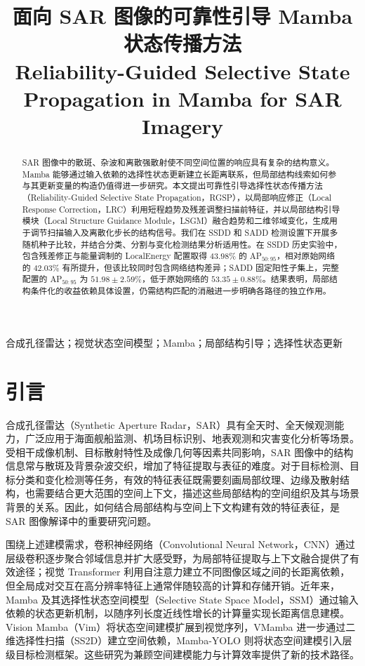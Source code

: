 \documentclass[journal]{IEEEtran}
\title{\LARGE 面向 SAR 图像的可靠性引导 Mamba 状态传播方法\\[0.5em]
{\large Reliability-Guided Selective State Propagation in Mamba for SAR Imagery}}
\author{}
\begin{document}
\maketitle
\begin{abstract}
SAR 图像中的散斑、杂波和离散强散射使不同空间位置的响应具有复杂的结构意义。Mamba 能够通过输入依赖的选择性状态更新建立长距离联系，但局部结构线索如何参与其更新变量的构造仍值得进一步研究。本文提出可靠性引导选择性状态传播方法（Reliability-Guided Selective State Propagation，RGSP），以局部响应修正（Local Response Correction，LRC）利用短程趋势及残差调整扫描前特征，并以局部结构引导模块（Local Structure Guidance Module，LSGM）融合趋势和二维邻域变化，生成用于调节扫描输入及离散化步长的结构信号。我们在 SSDD 和 SADD 检测设置下开展多随机种子比较，并结合分类、分割与变化检测结果分析适用性。在 SSDD 历史实验中，包含残差修正与能量调制的 LocalEnergy 配置取得 $43.98\%$ 的 AP$_{50:95}$，相对原始网络的 $42.03\%$ 有所提升，但该比较同时包含网络结构差异；SADD 固定阳性子集上，完整配置的 AP$_{50:95}$ 为 $51.98\pm2.59\%$，低于原始网络的 $53.35\pm0.88\%$。结果表明，局部结构条件化的收益依赖具体设置，仍需结构匹配的消融进一步明确各路径的独立作用。
\end{abstract}

\begin{IEEEkeywords}
合成孔径雷达；视觉状态空间模型；Mamba；局部结构引导；选择性状态更新
\end{IEEEkeywords}

\section{引言}
\label{sec:intro}

合成孔径雷达（Synthetic Aperture Radar，SAR）具有全天时、全天候观测能力，广泛应用于海面舰船监测、机场目标识别、地表观测和灾害变化分析等场景。受相干成像机制、目标散射特性及成像几何等因素共同影响，SAR 图像中的结构信息常与散斑及背景杂波交织，增加了特征提取与表征的难度。对于目标检测、目标分类和变化检测等任务，有效的特征表征既需要刻画局部纹理、边缘及散射结构，也需要结合更大范围的空间上下文，描述这些局部结构的空间组织及其与场景背景的关系。因此，如何结合局部结构与空间上下文构建有效的特征表征，是 SAR 图像解译中的重要研究问题。

围绕上述建模需求，卷积神经网络（Convolutional Neural Network，CNN）通过层级卷积逐步聚合邻域信息并扩大感受野，为局部特征提取与上下文融合提供了有效途径\cite{resnet2015}；视觉 Transformer 利用自注意力建立不同图像区域之间的长距离依赖\cite{vit2020}，但全局成对交互在高分辨率特征上通常伴随较高的计算和存储开销。近年来，Mamba 及其选择性状态空间模型（Selective State Space Model，SSM）通过输入依赖的状态更新机制，以随序列长度近线性增长的计算量实现长距离信息建模\cite{mamba2023}。Vision Mamba（Vim）将状态空间建模扩展到视觉序列\cite{vim2024}，VMamba 进一步通过二维选择性扫描（SS2D）建立空间依赖\cite{vmamba2024}，Mamba-YOLO 则将状态空间建模引入层级目标检测框架\cite{mambayolo2024}。这些研究为兼顾空间建模能力与计算效率提供了新的技术路径。
\end{document}
